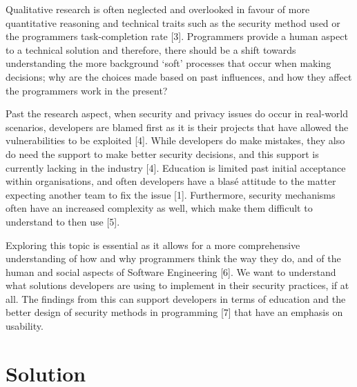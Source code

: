 \par Qualitative research is often neglected and overlooked in favour of more quantitative reasoning and technical traits such as the security method used or the programmers task-completion rate [3]. Programmers provide a human aspect to a technical solution and therefore, there should be a shift towards understanding the more background ‘soft’ processes that occur when making decisions; why are the choices made based on past influences, and how they affect the programmers work in the present?
\newline
\par Past the research aspect, when security and privacy issues do occur in real-world scenarios, developers are blamed first as it is their projects that have allowed the vulnerabilities to be exploited [4]. While developers do make mistakes, they also do need the support to make better security decisions, and this support is currently lacking in the industry [4]. Education is limited past initial acceptance within organisations, and often developers have a blasé attitude to the matter expecting another team to fix the issue [1]. Furthermore, security mechanisms often have an increased complexity as well, which make them difficult to understand to then use [5].
\newline
\par Exploring this topic is essential as it allows for a more comprehensive understanding of how and why programmers think the way they do, and of the human and social aspects of Software Engineering [6]. We want to understand what solutions developers are using to implement in their security practices, if at all. The findings from this can support developers in terms of education and the better design of security methods in programming [7] that have an emphasis on usability.

\section{Solution}

